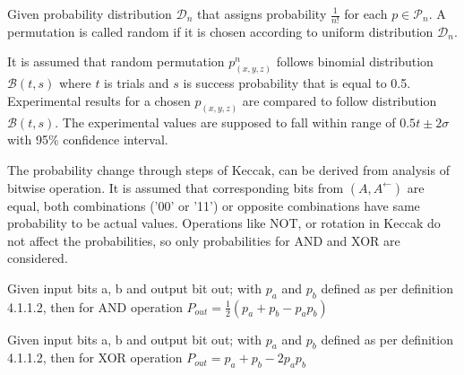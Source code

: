 \begin{defn}
Given probability distribution $\mathcal{D}_n$ that assigns probability $\frac{1}{n!}$ for each $p \in \mathcal{P}_n$.
A permutation is called random if it is chosen according to uniform distribution $\mathcal{D}_n$.\cite{00022}
\end{defn}

It is assumed that random permutation $p^n_{(x, y, z)}$ follows binomial distribution $\mathcal{B}(t, s)$ where $t$ is
trials and $s$ is success probability that is equal to 0.5. Experimental results for a chosen $p_{(x, y, z)}$ are 
compared to follow distribution $\mathcal{B}(t, s)$. The experimental values are supposed to fall within range of 
$0.5t\pm2\sigma$ with 95\% confidence interval.

The probability change through steps of Keccak, can be derived from analysis of bitwise operation. It is assumed
that corresponding bits from $(A, A^{\leftarrow})$ are equal, both combinations ('00' or '11') or opposite combinations
have same probability to be actual values. Operations like NOT, or rotation in Keccak do not affect the probabilities,
so only probabilities for AND and XOR are considered.

\begin{lem}
Given input bits a, b and output bit out; with $p_a$ and $p_b$ defined as per definition 4.1.1.2, then for AND operation
$P_{out} = \frac{1}{2}(p_{a} + p_{b} - p_{a} p_{b})$ \cite{00022}
\end{lem}

\begin{lem}
Given input bits a, b and output bit out; with $p_a$ and $p_b$ defined as per definition 4.1.1.2, then for XOR operation
$P_{out} = p_{a} + p_{b} - 2 p_{a} p_{b}$ \cite{00022}
\end{lem}

